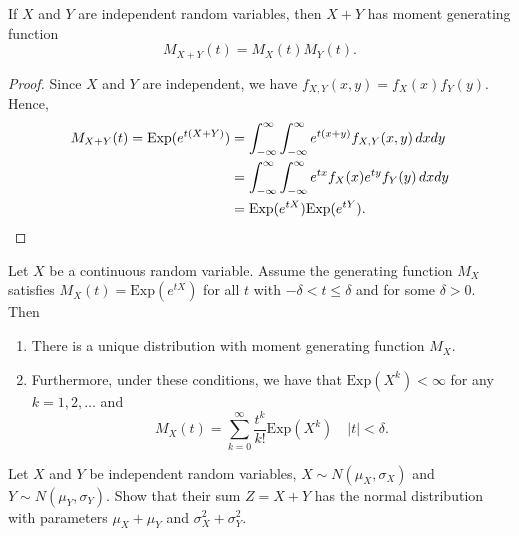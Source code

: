 \begin{theorem}\label{Thm:MomentGeneratingOfSum}
If $X$ and $Y$ are independent random variables, then $X + Y$ has moment generating function
    \[
        M_{X + Y} (t) = M_X (t) M_Y (t) .
    \]
\end{theorem}
\begin{proof}
Since $X$ and $Y$ are independent, we have $f_{X, Y} (x, y) = f_X (x) f_Y (y)$. Hence, 
    \begin{align*}
        M_{X + Y} (t) = \mathrm{Exp} (e^{t (X + Y)}) &= \int_{-\infty}^\infty \int_{-\infty}^\infty e^{t (x + y)} f_{X, Y} (x, y) \, dx dy \\ 
        &= \int_{-\infty}^\infty \int_{-\infty}^\infty e^{tx} f_X (x) e^{ty} f_Y (y) \, dx dy \\ 
        &= \mathrm{Exp} (e^{tX}) \mathrm{Exp} (e^{tY}) . \qedhere
    \end{align*}
\end{proof}

\begin{theorem}
Let $X$ be a continuous random variable. Assume the generating function $M_X$ satisfies $M_X (t) = \mathrm{Exp} (e^{tX})$ for all $t$ with $-\delta < t \leq \delta$ and for some $\delta > 0$. Then
    \begin{enumerate}[label=\alph*)]
         \item There is a unique distribution with moment generating function $M_X$.
         \item Furthermore, under these conditions, we have that $\mathrm{Exp} (X^k) < \infty$ for any $k = 1, 2, \ldots$ and
            \[
                M_X (t) = \sum_{k = 0}^\infty \frac{t^k}{k!} \mathrm{Exp} (X^k ) \quad |t| < \delta .
            \]
     \end{enumerate} 
\end{theorem}

\begin{example}
Let $X$ and $Y$ be independent random variables, $X \sim N (\mu_X , \sigma_X )$ and $Y \sim N (\mu_Y , \sigma_Y )$. Show that their sum $Z = X + Y$ has the normal distribution with parameters $\mu_X + \mu_Y$ and $\sigma_X^2 + \sigma_Y^2$.
\end{example}

